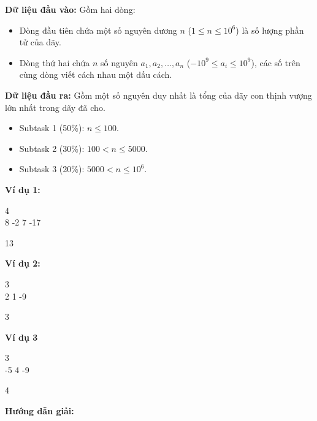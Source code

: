 \documentclass[12pt]{scrartcl}  %
\begin{document}
\textbf{Dữ liệu đầu vào:}
Gồm hai dòng:
\begin{itemize}
    \item Dòng đầu tiên chứa một số nguyên dương $n$ ($1 \leq n \leq 10^6$) là số lượng phần tử của dãy.
    \item Dòng thứ hai chứa $n$ số nguyên $a_1, a_2, \ldots, a_n$ ($-10^9 \leq a_i \leq 10^9$), các số trên cùng dòng viết cách nhau một dấu cách.
\end{itemize}

\textbf{Dữ liệu đầu ra:}
Gồm một số nguyên duy nhất là tổng của dãy con thịnh vượng lớn nhất trong dãy đã cho. 

\begin{itemize}
    \item Subtask 1 (50\%): $n \leq 100$.
    \item Subtask 2 (30\%): $100 < n \leq 5000$.
    \item Subtask 3 (20\%): $5000 < n \leq 10^6$.
\end{itemize}

\textbf{Ví dụ 1:}
\begin{tcolorbox}[colback=gray!5!white, colframe=blue!50!black, title=Input]
4\\
8 -2 7 -17
\end{tcolorbox}
\begin{tcolorbox}[colback=gray!5!white, colframe=green!50!black, title=Output]
13
\end{tcolorbox}

\textbf{Ví dụ 2:}
\begin{tcolorbox}[colback=gray!5!white, colframe=blue!50!black, title=Input]
3\\
2 1 -9
\end{tcolorbox}
\begin{tcolorbox}[colback=gray!5!white, colframe=green!50!black, title=Output]
3
\end{tcolorbox}

\textbf{Ví dụ 3}
\begin{tcolorbox}[colback=gray!5!white, colframe=blue!50!black, title=Input]
3\\
-5 4 -9
\end{tcolorbox}
\begin{tcolorbox}[colback=gray!5!white, colframe=green!50!black, title=Output]
4
\end{tcolorbox}

\textbf{Hướng dẫn giải:}
\end{document}
